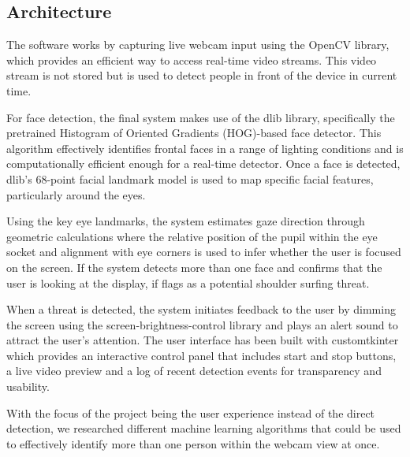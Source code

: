 \documentclass[12pt]{article}
\theoremstyle{plain}
\theoremstyle{definition}
\begin{document}
\subsection{Architecture}
\label{Architecture}
The software works by capturing live webcam input using the OpenCV library, which provides an efficient way to access real-time video streams. This video stream is not stored but is used to detect people in front of the device in current time.

For face detection, the final system makes use of the dlib library, specifically the pretrained Histogram of Oriented Gradients (HOG)-based face detector. This algorithm effectively identifies frontal faces in a range of lighting conditions and is computationally efficient enough for a real-time detector. Once a face is detected, dlib’s 68-point facial landmark model is used to map specific facial features, particularly around the eyes.

Using the key eye landmarks, the system estimates gaze direction through geometric calculations where the relative position of the pupil within the eye socket and alignment with eye corners is used to infer whether the user is focused on the screen. If the system detects more than one face and confirms that the user is looking at the display, if flags as a potential shoulder surfing threat.

When a threat is detected, the system initiates feedback to the user by dimming the screen using the screen-brightness-control library and plays an alert sound to attract the user’s attention. The user interface has been built with customtkinter which provides an interactive control panel that includes start and stop buttons, a live video preview and a log of recent detection events for transparency and usability.


With the focus of the project being the user experience instead of the direct detection, we researched different machine learning algorithms that could be used to effectively identify more than one person within the webcam view at once.
\end{document}
